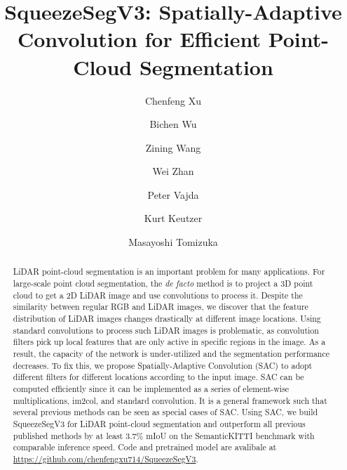 \documentclass[runningheads]{llncs}
\begin{document}
\title{SqueezeSegV3: Spatially-Adaptive Convolution for Efficient Point-Cloud Segmentation} 


\author{Chenfeng Xu \and
Bichen Wu \and Zining Wang  \and Wei Zhan \and Peter Vajda \and Kurt Keutzer \and Masayoshi Tomizuka}


\maketitle    
\begin{abstract}
LiDAR point-cloud segmentation is an important problem for many applications. For large-scale point cloud segmentation, the \textit{de facto} method is to project a 3D point cloud to get a 2D LiDAR image and use convolutions to process it. Despite the similarity between regular RGB and LiDAR images, we discover that the feature distribution of LiDAR images changes drastically at different image locations. Using standard convolutions to process such LiDAR images is problematic, as convolution filters pick up local features that are only active in specific regions in the image. As a result, the capacity of the network is under-utilized and the segmentation performance decreases. To fix this, we propose Spatially-Adaptive Convolution (SAC) to adopt different filters for different locations according to the input image. SAC can be computed efficiently since it can be implemented as a series of element-wise multiplications, im2col, and standard convolution. It is a general framework such that several previous methods can be seen as special cases of SAC. Using SAC, we build SqueezeSegV3 for LiDAR point-cloud segmentation and outperform all previous published methods by at least 3.7\% mIoU on the SemanticKITTI benchmark with comparable inference speed. Code and pretrained model are avalibale at \url{https://github.com/chenfengxu714/SqueezeSegV3}.
\end{abstract}
\end{document}
